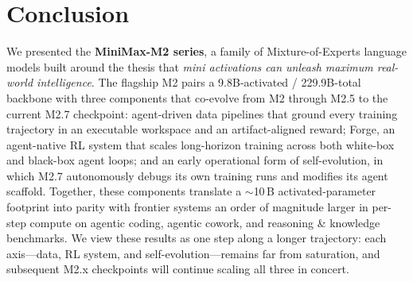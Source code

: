 \section{Conclusion}

We presented the \textbf{MiniMax-M2 series}, a family of Mixture-of-Experts language models built around the thesis that \emph{mini activations can unleash maximum real-world intelligence}. The flagship M2 pairs a 9.8B-activated / 229.9B-total backbone with three components that co-evolve from M2 through M2.5 to the current M2.7 checkpoint: agent-driven data pipelines that ground every training trajectory in an executable workspace and an artifact-aligned reward; Forge, an agent-native RL system that scales long-horizon training across both white-box and black-box agent loops; and an early operational form of self-evolution, in which M2.7 autonomously debugs its own training runs and modifies its agent scaffold. Together, these components translate a $\sim$10\,B activated-parameter footprint into parity with frontier systems an order of magnitude larger in per-step compute on agentic coding, agentic cowork, and reasoning \& knowledge benchmarks. We view these results as one step along a longer trajectory: each axis---data, RL system, and self-evolution---remains far from saturation, and subsequent M2.x checkpoints will continue scaling all three in concert.
